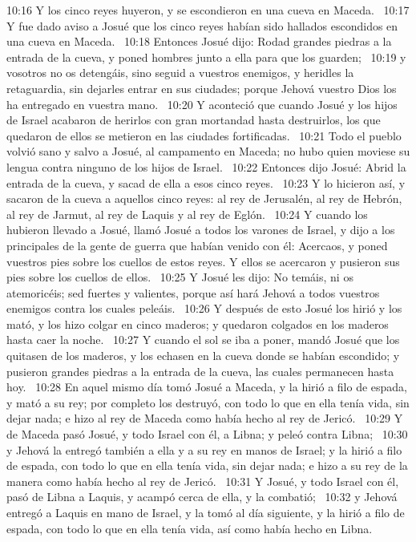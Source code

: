 10:16 Y los cinco reyes huyeron, y se escondieron en una cueva en Maceda.  
10:17 Y fue dado aviso a Josué que los cinco reyes habían sido hallados escondidos en una cueva en Maceda.  
10:18 Entonces Josué dijo: Rodad grandes piedras a la entrada de la cueva, y poned hombres junto a ella para que los guarden;  
10:19 y vosotros no os detengáis, sino seguid a vuestros enemigos, y heridles la retaguardia, sin dejarles entrar en sus ciudades; porque Jehová vuestro Dios los ha entregado en vuestra mano.  
10:20 Y aconteció que cuando Josué y los hijos de Israel acabaron de herirlos con gran mortandad hasta destruirlos, los que quedaron de ellos se metieron en las ciudades fortificadas.  
10:21 Todo el pueblo volvió sano y salvo a Josué, al campamento en Maceda; no hubo quien moviese su lengua contra ninguno de los hijos de Israel.  
10:22 Entonces dijo Josué: Abrid la entrada de la cueva, y sacad de ella a esos cinco reyes.  
10:23 Y lo hicieron así, y sacaron de la cueva a aquellos cinco reyes: al rey de Jerusalén, al rey de Hebrón, al rey de Jarmut, al rey de Laquis y al rey de Eglón.  
10:24 Y cuando los hubieron llevado a Josué, llamó Josué a todos los varones de Israel, y dijo a los principales de la gente de guerra que habían venido con él: Acercaos, y poned vuestros pies sobre los cuellos de estos reyes. Y ellos se acercaron y pusieron sus pies sobre los cuellos de ellos.  
10:25 Y Josué les dijo: No temáis, ni os atemoricéis; sed fuertes y valientes, porque así hará Jehová a todos vuestros enemigos contra los cuales peleáis.  
10:26 Y después de esto Josué los hirió y los mató, y los hizo colgar en cinco maderos; y quedaron colgados en los maderos hasta caer la noche.  
10:27 Y cuando el sol se iba a poner, mandó Josué que los quitasen de los maderos, y los echasen en la cueva donde se habían escondido; y pusieron grandes piedras a la entrada de la cueva, las cuales permanecen hasta hoy.  
10:28 En aquel mismo día tomó Josué a Maceda, y la hirió a filo de espada, y mató a su rey; por completo los destruyó, con todo lo que en ella tenía vida, sin dejar nada; e hizo al rey de Maceda como había hecho al rey de Jericó.  
10:29 Y de Maceda pasó Josué, y todo Israel con él, a Libna; y peleó contra Libna;  
10:30 y Jehová la entregó también a ella y a su rey en manos de Israel; y la hirió a filo de espada, con todo lo que en ella tenía vida, sin dejar nada; e hizo a su rey de la manera como había hecho al rey de Jericó.  
10:31 Y Josué, y todo Israel con él, pasó de Libna a Laquis, y acampó cerca de ella, y la combatió;  
10:32 y Jehová entregó a Laquis en mano de Israel, y la tomó al día siguiente, y la hirió a filo de espada, con todo lo que en ella tenía vida, así como había hecho en Libna.  
